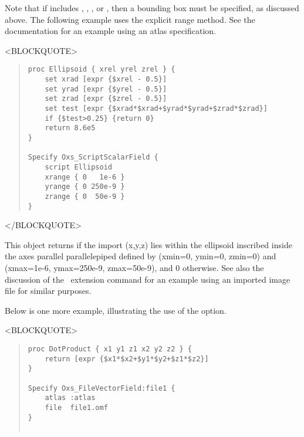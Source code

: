 \begin{description}
   Note that if  includes , ,
   , or , then a bounding box must be specified, as
   discussed above.  The following example uses the explicit range
   method.  See the 
   documentation
   for an example using an atlas specification.
\begin{rawhtml}<BLOCKQUOTE>\end{rawhtml}
\begin{quote}
\begin{verbatim}
proc Ellipsoid { xrel yrel zrel } {
    set xrad [expr {$xrel - 0.5}]
    set yrad [expr {$yrel - 0.5}]
    set zrad [expr {$zrel - 0.5}]
    set test [expr {$xrad*$xrad+$yrad*$yrad+$zrad*$zrad}]
    if {$test>0.25} {return 0}
    return 8.6e5
}

Specify Oxs_ScriptScalarField {
    script Ellipsoid
    xrange { 0   1e-6 }
    yrange { 0 250e-9 }
    zrange { 0  50e-9 }
}
\end{verbatim}
\end{quote}
\begin{rawhtml}</BLOCKQUOTE>\end{rawhtml}
   This  object returns  if the import (x,y,z) lies within the ellipsoid
   inscribed inside the axes parallel parallelepiped defined by (xmin=0,
   ymin=0, zmin=0) and (xmax=1e-6, ymax=250e-9, zmax=50e-9), and 0
   otherwise.
   See also the discussion of the
    \MIF\ extension command
    for an example using
   an imported image file for similar purposes.

   Below is one more example, illustrating the use of the
    option.
\begin{rawhtml}<BLOCKQUOTE>\end{rawhtml}
\begin{quote}
\begin{verbatim}
proc DotProduct { x1 y1 z1 x2 y2 z2 } {
    return [expr {$x1*$x2+$y1*$y2+$z1*$z2}]
}

Specify Oxs_FileVectorField:file1 {
    atlas :atlas
    file  file1.omf
}


\end{verbatim}
\end{quote}
\end{description}
